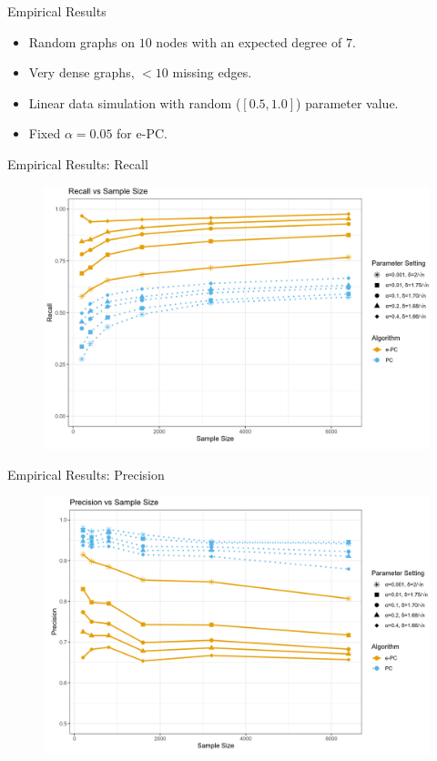 \documentclass{beamer}
\begin{document}
\begin{frame}{Empirical Results}
	\begin{itemize}
		\item Random graphs on $ 10 $ nodes with an expected degree of $ 7 $.
		\item Very dense graphs, $ < 10 $ missing edges.
		\item Linear data simulation with random ($ [0.5, 1.0] $) parameter value.
		\item Fixed $ \alpha = 0.05 $ for e-PC.
	\end{itemize}
\end{frame}

\begin{frame}{Empirical Results: Recall}
	\begin{figure}
		\centering
		\includegraphics[scale=0.2]{imgs/recall.png}
	\end{figure}
\end{frame}

\begin{frame}{Empirical Results: Precision}
	\begin{figure}
		\centering
		\includegraphics[scale=0.2]{imgs/precision.png}
	\end{figure}
\end{frame}
\end{document}
